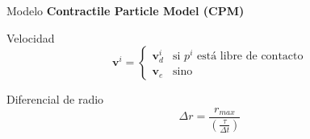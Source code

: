 \begin{frame}{Modelo}
    \textbf{\large{Contractile Particle Model (CPM)}}
    \begin{block}{Velocidad}
        \begin{equation*}
            \mathbf{v}^i = \begin{cases}
                \mathbf{v}_d^i & \text{si $p^i$ está libre de contacto} \\
                \mathbf{v}_e & \text{sino}
            \end{cases}
        \end{equation*}
    \end{block}
    \begin{block}{Diferencial de radio}
        \begin{equation*}
            \Delta r = \frac{r_{max}}{\left( \frac{\tau}{\Delta t} \right)}
        \end{equation*}
    \end{block}
\end{frame}



